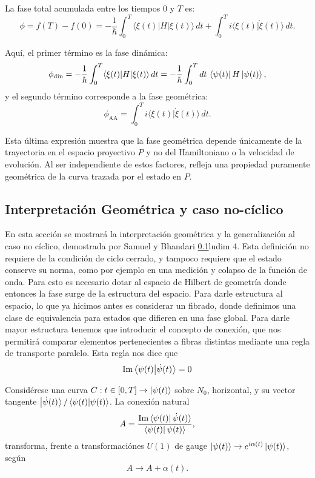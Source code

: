 La fase total acumulada entre los tiempos \( 0 \) y \( T \) es:
\[
\phi = f(T) - f(0) = -\frac{1}{\hbar} \int_0^T \langle \xi(t) | H | \xi(t) \rangle \, dt + \int_0^T i \langle \xi(t) | \dot{\xi}(t) \rangle \, dt.
\]

Aquí, el primer término es la fase dinámica:
\[
\phi_{\text{din}} = -\frac{1}{\hbar} \int_0^T \langle \xi(t) | H | \xi(t) \rangle \, dt = -\frac{1}{\hbar}\int_0^T dt \, \bra{\psi(t)}H\ket{\psi(t)},
\]
y el segundo término corresponde a la fase geométrica:
\begin{equation} \label{eq:fg AA}
    \phi_{\text{AA}} = \int_0^T i \langle \xi(t) | \dot{\xi}(t) \rangle \, dt.
\end{equation}

Esta última expresión muestra que la fase geométrica depende únicamente de la trayectoria en el espacio proyectivo \( P \) y no del Hamiltoniano o la velocidad de evolución. Al ser independiente de estos factores, refleja una propiedad puramente geométrica de la curva trazada por el estado en \( P \).



\subsection{Interpretación Geométrica y caso no-cíclico}
En esta sección se mostrará la interpretación geométrica y la generalización al caso no cíclico, demostrada por Samuel y Bhandari \ref{}ludim 4. Esta definición no requiere de la condición de ciclo cerrado, y tampoco requiere que el estado conserve su norma, como por ejemplo en una medición y colapso de la función de onda. Para esto es necesario dotar al espacio de Hilbert de geometría donde entonces la fase surge de la estructura del espacio. \newline
Para darle estructura al espacio, lo que ya hicimos antes es considerar un fibrado, donde definimos una clase de equivalencia para estados que difieren en una fase global. Para darle mayor estructura tenemos que introducir el concepto de conexión, que nos permitirá comparar elementos pertenecientes a fibras distintas mediante una regla de transporte paralelo. Esta regla nos dice que
\begin{equation} \label{eq2:transporte paralelo}
    \text{Im} \braket{\psi(t)}{\dot \psi(t)}=0
\end{equation}

Considérese una curva \( C: t \in [0, T] \to \ket{\psi(t)} \) sobre \( N_0 \), horizontal, y su vector tangente $\ket{\dot{\psi}(t)}/\braket{\psi(t)}{\psi(t)}$. La conexión natural
\begin{equation}
A = \frac{\text{Im} \bra{\psi(t)} \dot{\psi}(t) \rangle}{\bra{\psi(t)} \psi(t) \rangle},
\end{equation}
transforma, frente a transformaciónes \( U(1) \) de gauge \( \ket{\psi(t)} \to e^{i\alpha(t)} \ket{\psi(t)} \), según
\begin{equation} \label{eq2:transformación de gauge}
A \to A + \dot{\alpha}(t).
\end{equation}

